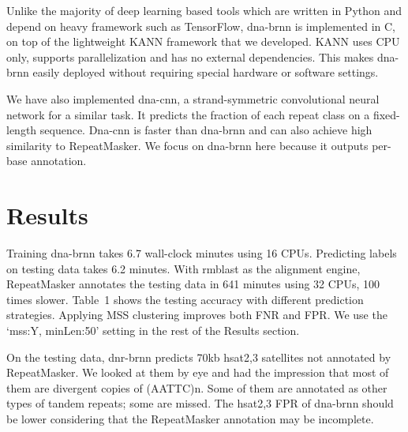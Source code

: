 \documentclass{bioinfo}
\begin{document}
\begin{methods}
Unlike the majority of deep learning based tools which are written in Python
and depend on heavy framework such as TensorFlow, dna-brnn is implemented in C,
on top of the lightweight KANN framework that we developed. KANN uses CPU only, supports
parallelization and has no external dependencies. This makes dna-brnn easily
deployed without requiring special hardware or software settings.

We have also implemented dna-cnn, a strand-symmetric convolutional neural network
for a similar task. It predicts the fraction of each repeat class on a
fixed-length sequence. Dna-cnn is faster than dna-brnn and can also achieve
high similarity to RepeatMasker. We focus on dna-brnn here because it outputs
per-base annotation.

\end{methods}

\section{Results}

Training dna-brnn takes 6.7 wall-clock minutes using 16 CPUs. Predicting labels
on testing data takes 6.2 minutes.
With rmblast as the alignment engine, RepeatMasker annotates the testing data in
641 minutes using 32 CPUs, 100 times slower. Table~1 shows the testing accuracy
with different prediction strategies. Applying MSS clustering improves both FNR
and FPR. We use the `mss:Y, minLen:50' setting in the rest of the Results
section.

On the testing data, dnr-brnn predicts 70kb hsat2,3 satellites not annotated
by RepeatMasker. We looked at them by eye and had the impression that most of
them are divergent copies of (AATTC)n. Some of them are annotated as other
types of tandem repeats; some are missed. The hsat2,3 FPR of dna-brnn should be
lower considering that the RepeatMasker annotation may be incomplete.
\end{document}
